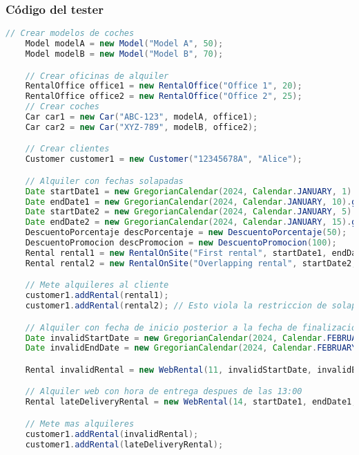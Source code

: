\subsubsection*{Código del tester}
\begin{lstlisting}[style = javaNormal, language=Java] 
    // Crear modelos de coches
    Model modelA = new Model("Model A", 50);
    Model modelB = new Model("Model B", 70);

    // Crear oficinas de alquiler
    RentalOffice office1 = new RentalOffice("Office 1", 20);
    RentalOffice office2 = new RentalOffice("Office 2", 25);
    // Crear coches
    Car car1 = new Car("ABC-123", modelA, office1);
    Car car2 = new Car("XYZ-789", modelB, office2);

    // Crear clientes
    Customer customer1 = new Customer("12345678A", "Alice");

    // Alquiler con fechas solapadas
    Date startDate1 = new GregorianCalendar(2024, Calendar.JANUARY, 1).getTime();
    Date endDate1 = new GregorianCalendar(2024, Calendar.JANUARY, 10).getTime();
    Date startDate2 = new GregorianCalendar(2024, Calendar.JANUARY, 5).getTime(); // Solapado
    Date endDate2 = new GregorianCalendar(2024, Calendar.JANUARY, 15).getTime();
    DescuentoPorcentaje descPorcentaje = new DescuentoPorcentaje(50);
    DescuentoPromocion descPromocion = new DescuentoPromocion(100);
    Rental rental1 = new RentalOnSite("First rental", startDate1, endDate1, customer1, car1, office1,descPorcentaje);
    Rental rental2 = new RentalOnSite("Overlapping rental", startDate2, endDate2, customer1, car1, office1,descPromocion);

    // Mete alquileres al cliente
    customer1.addRental(rental1);
    customer1.addRental(rental2); // Esto viola la restriccion de solapamiento

    // Alquiler con fecha de inicio posterior a la fecha de finalizacion
    Date invalidStartDate = new GregorianCalendar(2024, Calendar.FEBRUARY, 10).getTime();
    Date invalidEndDate = new GregorianCalendar(2024, Calendar.FEBRUARY, 5).getTime(); // Invalido

    Rental invalidRental = new WebRental(11, invalidStartDate, invalidEndDate, customer1, car2, office2,null);

    // Alquiler web con hora de entrega despues de las 13:00
    Rental lateDeliveryRental = new WebRental(14, startDate1, endDate1, customer1, car2, office1,null); // Invalido

    // Mete mas alquileres
    customer1.addRental(invalidRental);
    customer1.addRental(lateDeliveryRental);


\end{lstlisting}
